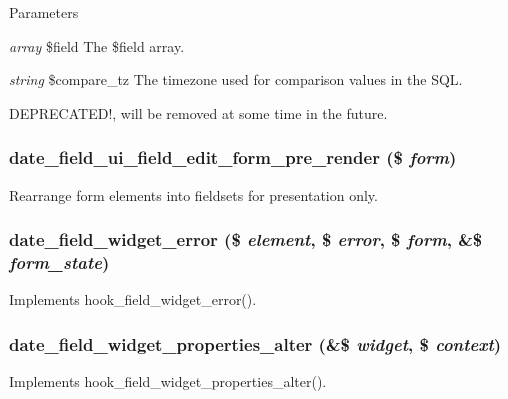 \begin{DoxyParams}{Parameters}
\item[{\em array}]\$field The \$field array. \item[{\em string}]\$compare\_\-tz The timezone used for comparison values in the SQL.\end{DoxyParams}
DEPRECATED!, will be removed at some time in the future. \hypertarget{date_8module_aa7dfa6775921c3fbf7f8ceae70f6f519}{
\subsubsection[{date\_\-field\_\-ui\_\-field\_\-edit\_\-form\_\-pre\_\-render}]{\setlength{\rightskip}{0pt plus 5cm}date\_\-field\_\-ui\_\-field\_\-edit\_\-form\_\-pre\_\-render (\$ {\em form})}}
\label{date_8module_aa7dfa6775921c3fbf7f8ceae70f6f519}
Rearrange form elements into fieldsets for presentation only. \hypertarget{date_8module_a227ffb57a05af9ccef60099ad0915228}{
\subsubsection[{date\_\-field\_\-widget\_\-error}]{\setlength{\rightskip}{0pt plus 5cm}date\_\-field\_\-widget\_\-error (\$ {\em element}, \/  \$ {\em error}, \/  \$ {\em form}, \/  \&\$ {\em form\_\-state})}}
\label{date_8module_a227ffb57a05af9ccef60099ad0915228}
Implements hook\_\-field\_\-widget\_\-error(). \hypertarget{date_8module_afe34456f5b7c190e42133c211d76b42e}{
\subsubsection[{date\_\-field\_\-widget\_\-properties\_\-alter}]{\setlength{\rightskip}{0pt plus 5cm}date\_\-field\_\-widget\_\-properties\_\-alter (\&\$ {\em widget}, \/  \$ {\em context})}}
\label{date_8module_afe34456f5b7c190e42133c211d76b42e}
Implements hook\_\-field\_\-widget\_\-properties\_\-alter().

